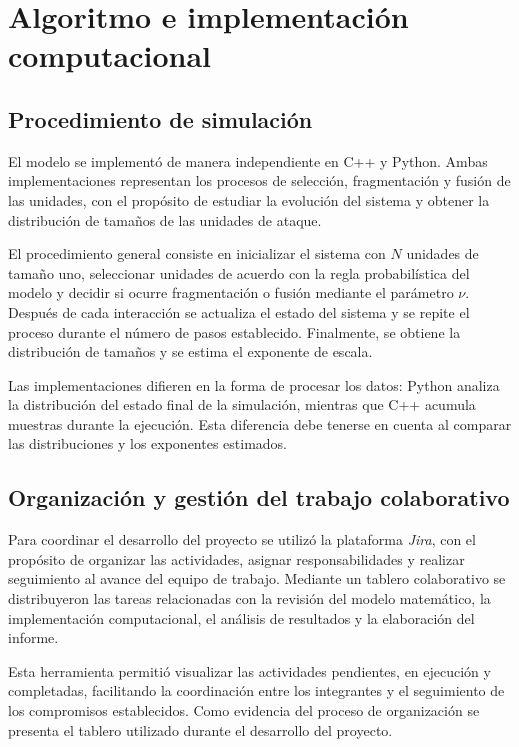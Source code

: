 \documentclass[
a4paper,
amsfonts,
amssymb,
amsmath,
reprint,
twoside
]{revtex4-1}
\begin{document}
\section{Algoritmo e implementación computacional}

\subsection{Procedimiento de simulación}

El modelo se implementó de manera independiente en C++ y Python.
Ambas implementaciones representan los procesos de selección,
fragmentación y fusión de las unidades, con el propósito de
estudiar la evolución del sistema y obtener la distribución de
tamaños de las unidades de ataque.

El procedimiento general consiste en inicializar el sistema con
$N$ unidades de tamaño uno, seleccionar unidades de acuerdo con
la regla probabilística del modelo y decidir si ocurre
fragmentación o fusión mediante el parámetro $\nu$. Después de
cada interacción se actualiza el estado del sistema y se repite
el proceso durante el número de pasos establecido. Finalmente,
se obtiene la distribución de tamaños y se estima el exponente
de escala.

Las implementaciones difieren en la forma de procesar los datos:
Python analiza la distribución del estado final de la simulación,
mientras que C++ acumula muestras durante la ejecución. Esta
diferencia debe tenerse en cuenta al comparar las distribuciones
y los exponentes estimados.

\subsection{Organización y gestión del trabajo colaborativo}

Para coordinar el desarrollo del proyecto se utilizó la plataforma
\textit{Jira}, con el propósito de organizar las actividades,
asignar responsabilidades y realizar seguimiento al avance
del equipo de trabajo. Mediante un tablero colaborativo se
distribuyeron las tareas relacionadas con la revisión del modelo
matemático, la implementación computacional, el análisis de
resultados y la elaboración del informe.

Esta herramienta permitió visualizar las actividades pendientes,
en ejecución y completadas, facilitando la coordinación entre
los integrantes y el seguimiento de los compromisos establecidos.
Como evidencia del proceso de organización se presenta el tablero
utilizado durante el desarrollo del proyecto.
\end{document}

